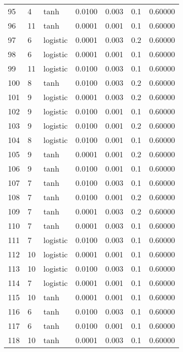 \begin{tabular}{lllrrrr}
95  &           4 &      tanh &  0.0100 &  0.003 &  0.1 &   0.60000 \\
96  &          11 &      tanh &  0.0001 &  0.001 &  0.1 &   0.60000 \\
97  &           6 &  logistic &  0.0001 &  0.003 &  0.2 &   0.60000 \\
98  &           6 &  logistic &  0.0001 &  0.001 &  0.1 &   0.60000 \\
99  &          11 &  logistic &  0.0100 &  0.003 &  0.1 &   0.60000 \\
100 &           8 &      tanh &  0.0100 &  0.003 &  0.2 &   0.60000 \\
101 &           9 &  logistic &  0.0001 &  0.003 &  0.2 &   0.60000 \\
102 &           9 &  logistic &  0.0100 &  0.001 &  0.1 &   0.60000 \\
103 &           9 &  logistic &  0.0100 &  0.001 &  0.2 &   0.60000 \\
104 &           8 &  logistic &  0.0100 &  0.001 &  0.1 &   0.60000 \\
105 &           9 &      tanh &  0.0001 &  0.001 &  0.2 &   0.60000 \\
106 &           9 &      tanh &  0.0100 &  0.001 &  0.1 &   0.60000 \\
107 &           7 &      tanh &  0.0100 &  0.003 &  0.1 &   0.60000 \\
108 &           7 &      tanh &  0.0100 &  0.001 &  0.2 &   0.60000 \\
109 &           7 &      tanh &  0.0001 &  0.003 &  0.2 &   0.60000 \\
110 &           7 &      tanh &  0.0001 &  0.003 &  0.1 &   0.60000 \\
111 &           7 &  logistic &  0.0100 &  0.003 &  0.1 &   0.60000 \\
112 &          10 &  logistic &  0.0001 &  0.001 &  0.1 &   0.60000 \\
113 &          10 &  logistic &  0.0100 &  0.003 &  0.1 &   0.60000 \\
114 &           7 &  logistic &  0.0001 &  0.001 &  0.1 &   0.60000 \\
115 &          10 &      tanh &  0.0001 &  0.001 &  0.1 &   0.60000 \\
116 &           6 &      tanh &  0.0100 &  0.003 &  0.1 &   0.60000 \\
117 &           6 &      tanh &  0.0100 &  0.001 &  0.1 &   0.60000 \\
118 &          10 &      tanh &  0.0001 &  0.003 &  0.1 &   0.60000 \\

\end{tabular}
